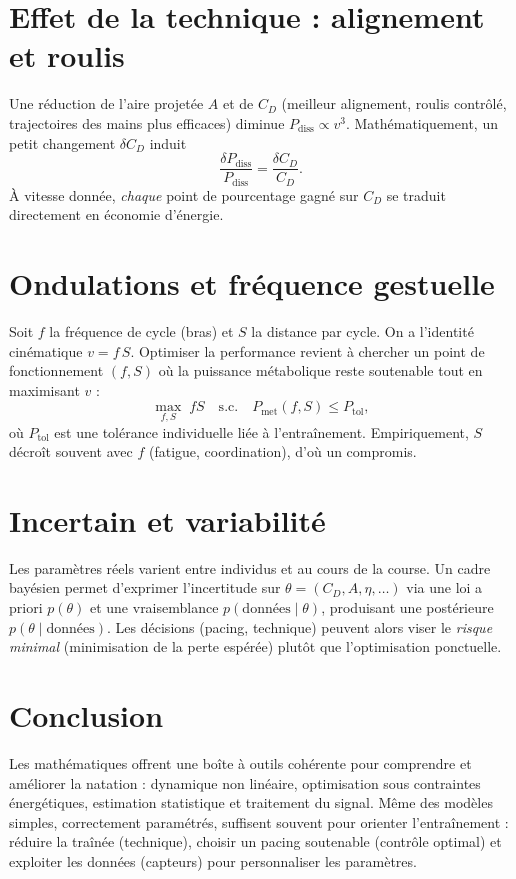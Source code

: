 \documentclass[12pt,a4paper]{article}
\begin{document}
\section{Effet de la technique : alignement et roulis}
Une réduction de l'aire projetée $A$ et de $C_D$ (meilleur alignement, roulis contrôlé, trajectoires des mains plus efficaces) diminue $P_{\mathrm{diss}}\propto v^3$. Mathématiquement, un petit changement $\delta C_D$ induit
\begin{equation}
 \frac{\delta P_{\mathrm{diss}}}{P_{\mathrm{diss}}} = \frac{\delta C_D}{C_D}.
 \end{equation}
À vitesse donnée, \emph{chaque} point de pourcentage gagné sur $C_D$ se traduit directement en économie d'énergie.

\section{Ondulations et fréquence gestuelle}
Soit $f$ la fréquence de cycle (bras) et $S$ la distance par cycle. On a l'identité cinématique $v=f\,S$. Optimiser la performance revient à chercher un point de fonctionnement $(f,S)$ où la puissance métabolique reste soutenable tout en maximisant $v$ :
\begin{equation}
 \max_{f,S}\; fS \quad \text{s.c.}\quad P_{\mathrm{met}}(f,S)\le P_{\mathrm{tol}},
 \end{equation}
où $P_{\mathrm{tol}}$ est une tolérance individuelle liée à l'entraînement. Empiriquement, $S$ décroît souvent avec $f$ (fatigue, coordination), d'où un compromis.

\section{Incertain et variabilité}
Les paramètres réels varient entre individus et au cours de la course. Un cadre bayésien permet d'exprimer l'incertitude sur $\theta=(C_D,A,\eta,\ldots)$ via une loi a priori $p(\theta)$ et une vraisemblance $p(\text{données}\mid\theta)$, produisant une postérieure $p(\theta\mid\text{données})$. Les décisions (pacing, technique) peuvent alors viser le \emph{risque minimal} (minimisation de la perte espérée) plutôt que l'optimisation ponctuelle.

\section{Conclusion}
Les mathématiques offrent une boîte à outils cohérente pour comprendre et améliorer la natation : dynamique non linéaire, optimisation sous contraintes énergétiques, estimation statistique et traitement du signal. Même des modèles simples, correctement paramétrés, suffisent souvent pour orienter l'entraînement : réduire la traînée (technique), choisir un pacing soutenable (contrôle optimal) et exploiter les données (capteurs) pour personnaliser les paramètres.
\end{document}
